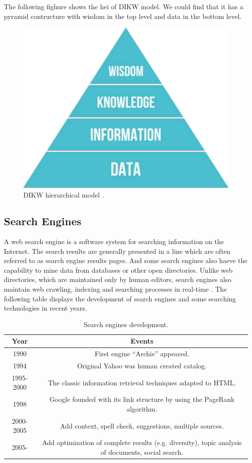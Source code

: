 \documentclass[sigconf]{acmart}
\begin{document}
The following fighure shows the hei of DIKW model. We could find that it has a pyramid contructure with wisdom in the top level and data in the bottom level.
\begin{figure}
\includegraphics[width=0.30\columnwidth]{images/DIKW_Pyramid}
\caption{DIKW hierarchical model \cite{editor06}.}
\end{figure}

\subsection{Search Engines}
A web search engine is a software system for searching information on the Internet. The search results are generally presented in a line which are often referred to as search engine results pages. And some search engines also haeve the capability to mine data from databases or other open directories. Unlike web directories, which are maintained only by human editors, search engines also maintain web crawling, indexing and searching processes in real-time \cite{editor05}. The following table displays the development of search engines and some searching technologies in recent years.
\begin{table}
\centering
\begin{tabular}{|c|c|} \hline
\textsf{Year} & \textsf{Events} \\ \hline
1990 & First engine ``Archie'' appeared. \\ \hline
1994 & Original Yahoo was human created catalog. \\ \hline
1995-2000 & The classic information retrieval techniques adapted to HTML. \\ \hline 
1998 & Google founded with its link structure by using the PageRank algorithm. \\ \hline
2000-2005 & Add context, spell check, suggestions, multiple sources. \\ \hline
2005- & Add optimization of complete results (e.g. diversity), topic analysis of documents, social search. \\ \hline
\end{tabular}
\caption{Search engines development.}
\end{table}
\end{document}
